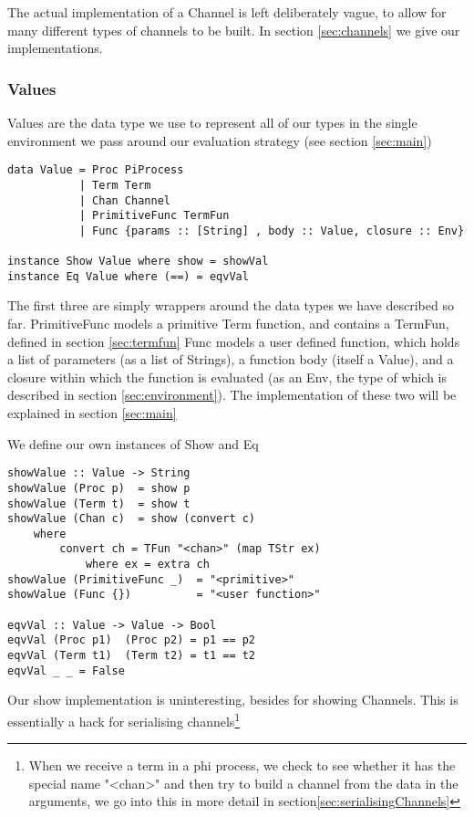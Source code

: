 The actual implementation of a Channel is left deliberately vague, to allow for many different types of channels to be built. In section \ref{sec:channels} we give our implementations.

\subsubsection{Values}
\label{sec:values}
Values are the data type we use to represent all of our types in the single environment we pass around our evaluation strategy (see section \ref{sec:main})

\begin{verbatim}
data Value = Proc PiProcess 
           | Term Term
           | Chan Channel
           | PrimitiveFunc TermFun
           | Func {params :: [String] , body :: Value, closure :: Env}

instance Show Value where show = showVal
instance Eq Value where (==) = eqvVal
\end{verbatim}

The first three are simply wrappers around the data types we have described so far.
PrimitiveFunc models a primitive Term function, and contains a TermFun, defined in section \ref{sec:termfun}
Func models a user defined function, which holds a list of parameters (as a list of Strings), a function body (itself a Value), and a closure within which the function is evaluated (as an Env, the type of which is described in section \ref{sec:environment}). The implementation of these two will be explained in section \ref{sec:main}

We define our own instances of Show and Eq

\begin{verbatim}
showValue :: Value -> String
showValue (Proc p)  = show p
showValue (Term t)  = show t
showValue (Chan c)  = show (convert c)
    where 
        convert ch = TFun "<chan>" (map TStr ex) 
            where ex = extra ch
showValue (PrimitiveFunc _)  = "<primitive>" 
showValue (Func {})          = "<user function>"  

eqvVal :: Value -> Value -> Bool
eqvVal (Proc p1)  (Proc p2) = p1 == p2
eqvVal (Term t1)  (Term t2) = t1 == t2
eqvVal _ _ = False
\end{verbatim}

Our show implementation is uninteresting, besides for showing Channels. This is essentially a hack for serialising channels\footnote{When we receive a term in a phi process, we check to see whether it has the special name "<chan>" and then try to build a channel from the data in the arguments, we go into this in more detail in section\ref{sec:serialisingChannels}}

